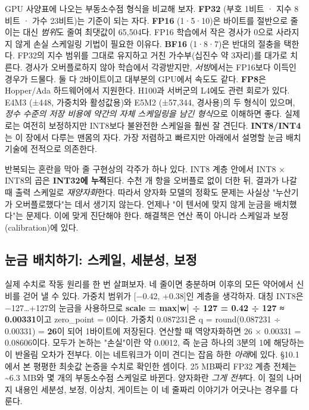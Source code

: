 GPU 사양표에 나오는 부동소수점 형식을 비교해 보자. \textbf{FP32} (부호 1비트 · 지수 8비트 · 가수 23비트)는 기준이 되는 자다. \textbf{FP16} (1·5·10)은 바이트를 절반으로 줄이는 대신 \textit{범위}도 줄여 최댓값이 65,504다. FP16 학습에서 작은 경사가 0으로 사라지지 않게 손실 스케일링 기법이 필요한 이유다. \textbf{BF16} (1·8·7)은 반대의 절충을 택한다. FP32의 지수 범위를 그대로 유지하고 거친 가수부(십진수 약 3자리)를 대가로 치른다. 경사가 오버플로하지 않아 학습에서 각광받지만, \textit{서빙}에서는 FP16보다 이득인 경우가 드물다. 둘 다 2바이트이고 대부분의 GPU에서 속도도 같다. \textbf{FP8}은 Hopper/Ada 하드웨어에서 지원한다. H100과 서버군의 L4에도 관련 회로가 있다. E4M3 (±448, 가중치와 활성값용)와 E5M2 (±57,344, 경사용)의 두 형식이 있으며, \textit{정수 수준의 저장 비용에 약간의 자체 스케일링을 남긴 형식}으로 이해하면 좋다. 실제로는 여전히 보정하지만 INT8보다 불완전한 스케일을 훨씬 잘 견딘다. \textbf{INT8/INT4}는 이 장에서 다루는 맨몸의 자다. 가장 저렴하고 빠르지만 아래에서 설명할 눈금 배치 기술에 전적으로 의존한다.

반복되는 혼란을 막아 줄 구현상의 각주가 하나 있다. INT8 계층 안에서 INT8 × INT8의 곱은 \textbf{INT32에 누적}된다. 수천 개 항을 오버플로 없이 더한 뒤, 결과가 나갈 때 출력 스케일로 \textit{재양자화}한다. 따라서 양자화 모델의 정확도 문제는 사실상 "누산기가 오버플로했다"는 데서 생기지 않는다. 언제나 "이 텐서에 맞지 않게 눈금을 배치했다"는 문제다. 이에 맞게 진단해야 한다. 해결책은 연산 폭이 아니라 스케일과 보정(calibration)에 있다.

\subsection*{눈금 배치하기: 스케일, 세분성, 보정}

실제 수치로 작동 원리를 한 번 살펴보자. 네 줄이면 충분하며 이후의 모든 약어에서 신비를 걷어 낼 수 있다. 가중치 범위가 [−0.42, +0.38]인 계층을 생각하자. 대칭 INT8은 −127…+127의 눈금을 사용하므로 \textbf{scale = max|w| ÷ 127 = 0.42 ÷ 127 ≈ 0.00331}이고 zero\_point = 0이다. 가중치 0.087231은 q = round(0.087231 ÷ 0.00331) = \textbf{26}이 되어 1바이트에 저장된다. 연산할 때 역양자화하면 26 × 0.00331 = 0.08606이다. 모두가 논하는 "손실"이란 약 0.0012, 즉 눈금 하나의 3분의 1에 해당하는 이 반올림 오차가 전부다. 이는 네트워크가 이미 견디는 잡음 하한 \textit{아래}에 있다. §10.1에서 본 평평한 최솟값 논증을 수치로 확인한 셈이다. 25 MB짜리 FP32 계층 전체는 \textasciitilde{}6.3 MB와 몇 개의 부동소수점 스케일로 바뀐다. 양자화란 \textit{그게 전부}다. 이 절의 나머지 내용인 세분성, 보정, 이상치, 게이트는 이 네 줄짜리 이야기가 어긋나는 경우를 다룬다.

